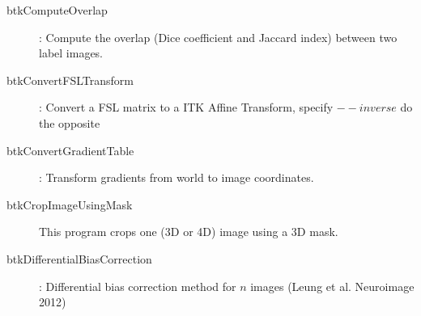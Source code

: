 \begin{description}
\item[btkComputeOverlap]: Compute the overlap (Dice coefficient and Jaccard index) between two label images.
\item[btkConvertFSLTransform]: Convert a FSL matrix to a ITK Affine Transform, specify $--inverse$ do the opposite
\item[btkConvertGradientTable]: Transform gradients from world to image coordinates.

\item[btkCropImageUsingMask] This program crops one (3D or 4D) image using a 3D mask.
\item[btkDifferentialBiasCorrection]: Differential bias correction method for $n$ images (Leung et al. Neuroimage 2012) 


\end{description}
